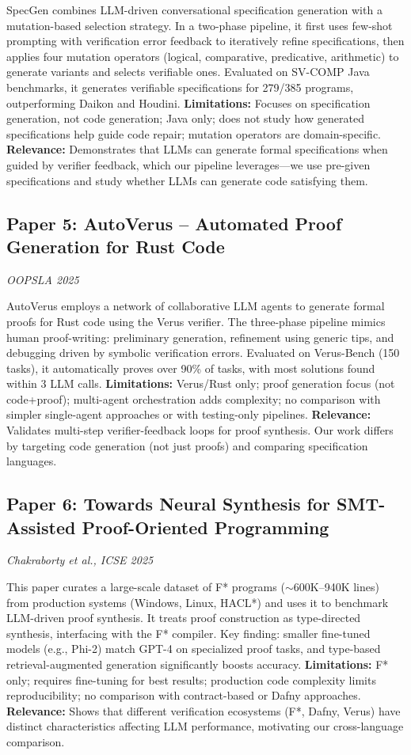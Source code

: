 \documentclass[11pt,a4paper]{article}
\begin{document}
SpecGen combines LLM-driven conversational specification generation with a mutation-based selection strategy. In a two-phase pipeline, it first uses few-shot prompting with verification error feedback to iteratively refine specifications, then applies four mutation operators (logical, comparative, predicative, arithmetic) to generate variants and selects verifiable ones. Evaluated on SV-COMP Java benchmarks, it generates verifiable specifications for 279/385 programs, outperforming Daikon and Houdini. \textbf{Limitations:} Focuses on specification generation, not code generation; Java only; does not study how generated specifications help guide code repair; mutation operators are domain-specific. \textbf{Relevance:} Demonstrates that LLMs can generate formal specifications when guided by verifier feedback, which our pipeline leverages---we use pre-given specifications and study whether LLMs can generate code satisfying them.

\subsection{Paper 5: AutoVerus -- Automated Proof Generation for Rust Code}
\textit{OOPSLA 2025} \cite{autoverus2025}

AutoVerus employs a network of collaborative LLM agents to generate formal proofs for Rust code using the Verus verifier. The three-phase pipeline mimics human proof-writing: preliminary generation, refinement using generic tips, and debugging driven by symbolic verification errors. Evaluated on Verus-Bench (150 tasks), it automatically proves over 90\% of tasks, with most solutions found within 3 LLM calls. \textbf{Limitations:} Verus/Rust only; proof generation focus (not code+proof); multi-agent orchestration adds complexity; no comparison with simpler single-agent approaches or with testing-only pipelines. \textbf{Relevance:} Validates multi-step verifier-feedback loops for proof synthesis. Our work differs by targeting code generation (not just proofs) and comparing specification languages.

\subsection{Paper 6: Towards Neural Synthesis for SMT-Assisted Proof-Oriented Programming}
\textit{Chakraborty et al., ICSE 2025} \cite{fstar2025}

This paper curates a large-scale dataset of F* programs ($\sim$600K--940K lines) from production systems (Windows, Linux, HACL*) and uses it to benchmark LLM-driven proof synthesis. It treats proof construction as type-directed synthesis, interfacing with the F* compiler. Key finding: smaller fine-tuned models (e.g., Phi-2) match GPT-4 on specialized proof tasks, and type-based retrieval-augmented generation significantly boosts accuracy. \textbf{Limitations:} F* only; requires fine-tuning for best results; production code complexity limits reproducibility; no comparison with contract-based or Dafny approaches. \textbf{Relevance:} Shows that different verification ecosystems (F*, Dafny, Verus) have distinct characteristics affecting LLM performance, motivating our cross-language comparison.
\end{document}
